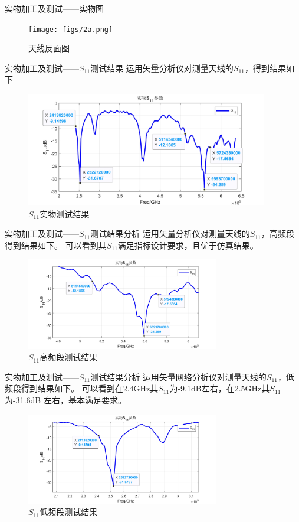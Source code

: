 \documentclass[10pt]{beamer}
\begin{document}
\begin{frame}{实物加工及测试——{\normalsize 实物图}}
	\begin{figure}[htbp]
		\centering
		\texttt{[image: figs/2a.png]}
		\caption{天线反面图}
		\label{2}
	\end{figure}
\end{frame}

\begin{frame}{实物加工及测试——{\normalsize $S_{11}$测试结果}}
	\qquad 运用矢量分析仪对测量天线的$S_{11}$，得到结果如下
	\begin{figure}[htbp]
		\centering
		\includegraphics[height=5cm]{figs/25.jpg}
		\caption{$S_{11}$实物测试结果}
	\end{figure}
\end{frame}


\begin{frame}{实物加工及测试——{\normalsize $S_{11}$测试结果分析}}
	\qquad 运用矢量分析仪对测量天线的$S_{11}$，高频段得到结果如下。
	可以看到其$S_{11}$满足指标设计要求，且优于仿真结果。
	\begin{figure}[htbp]
		\centering
		\includegraphics[height=4cm]{figs/27.jpg}
		\caption{$S_{11}$高频段测试结果}
	\end{figure}
\end{frame}

\begin{frame}{实物加工及测试——{\normalsize $S_{11}$测试结果分析}}
	\qquad 运用矢量网络分析仪对测量天线的$S_{11}$，低频段得到结果如下。
	可以看到在2.4GHz其$S_{11}$为-9.1dB左右，在2.5GHz其$S_{11}$为-31.6dB
	左右，基本满足要求。

	\begin{figure}[htbp]
		\centering
		\includegraphics[height=4cm]{figs/26.jpg}
		\caption{$S_{11}$低频段测试结果}
	\end{figure}
\end{frame}
\end{document}
